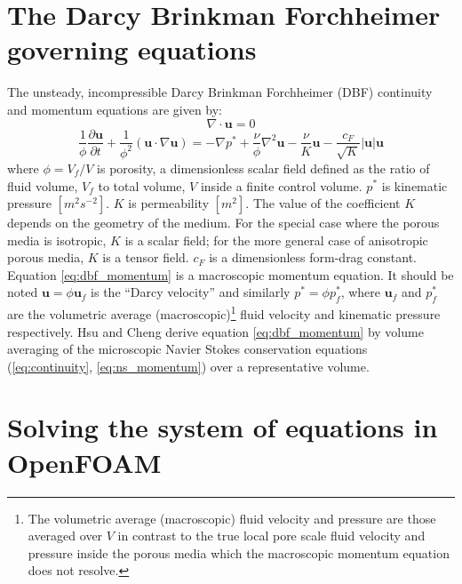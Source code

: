 \documentclass[a4paper,11pt]{report}
\begin{document}
\chapter{The Darcy Brinkman Forchheimer governing equations}
The unsteady, incompressible Darcy Brinkman Forchheimer (DBF) continuity and momentum equations are given by:
\begin{equation}
    \nabla\cdot\mathbf{u} = 0
    \label{eq:dbf_continuity}
\end{equation}
\begin{equation}
    \frac{1}{\phi}\frac{\partial\mathbf{u}}{\partial{t}} + \frac{1}{\phi^{2}}(\mathbf{u}\cdot\nabla\mathbf{u}) = -\nabla{p^*} + \frac{\nu}{\phi}\nabla^{2}\mathbf{u} - \frac{\nu}{K}\mathbf{u} - \frac{c_{F}}{\sqrt{K}}\lvert\mathbf{u}\rvert\mathbf{u}
    \label{eq:dbf_momentum}
\end{equation}
where $\phi=V_f/V$ is porosity, a dimensionless scalar field defined as the ratio of fluid volume, $V_f$ to total volume, $V$ inside a finite control volume. $p^*$ is kinematic pressure $[m^2s^{-2}]$. $K$ is permeability $[m^2]$. The value of the coefficient $K$ depends on the geometry of the medium. For the special case where the porous media is isotropic, $K$ is a scalar field; for the more general case of anisotropic porous media, $K$ is a tensor field. $c_F$ is a dimensionless form-drag constant.
\vspace{5mm}\\
Equation \ref{eq:dbf_momentum} is a macroscopic momentum equation. It should be noted $\mathbf{u} = \phi\mathbf{u}_f$ is the ``Darcy velocity'' and similarly $p^* = \phi{p^*_f}$, where $\mathbf{u}_f$ and $p^*_f$ are the volumetric average (macroscopic)\footnote{The volumetric average (macroscopic) fluid velocity and pressure are those averaged over $V$ in contrast to the true local pore scale fluid velocity and pressure inside the porous media which the macroscopic momentum equation does not resolve.} fluid velocity and kinematic pressure respectively. Hsu and Cheng \cite{Hsu1990} derive equation \ref{eq:dbf_momentum} by volume averaging of the microscopic Navier Stokes conservation equations (\ref{eq:continuity}, \ref{eq:ns_momentum}) over a representative volume.

\chapter{Solving the system of equations in OpenFOAM}
\end{document}
